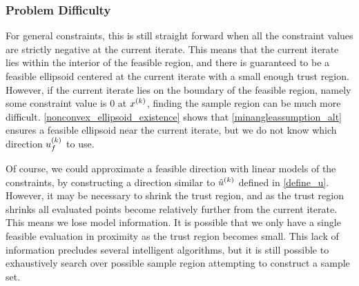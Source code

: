 \subsubsection{Problem Difficulty}

For general constraints, this is still straight forward when all the constraint values are strictly negative at the current iterate.
This means that the current iterate lies within the interior of the feasible region,
and there is guaranteed to be a feasible ellipsoid centered at the current iterate with a small enough trust region.
However, if the current iterate lies on the boundary of the feasible region, namely some constraint value is $0$ at $x^{(k)}$, finding the sample region can be much more difficult.
\cref{nonconvex_ellipsoid_existence} shows that \cref{minangleassumption_alt} ensures a feasible ellipsoid near the current iterate,
but we do not know which direction ${u^{(k)}_f}$ to use.

Of course, we could approximate a feasible direction with linear models of the constraints, by constructing a direction similar to ${{\hat u}^{(k)}}$ defined in \cref{define_u}.
However, it may be necessary to shrink the trust region, and as the trust region shrinks all evaluated points become relatively further from the current iterate.
This means we lose model information.
It is possible that we only have a single feasible evaluation in proximity as the trust region becomes small.
This lack of information precludes several intelligent algorithms,
but it is still possible to exhaustively search over possible sample region attempting to construct a sample set.



